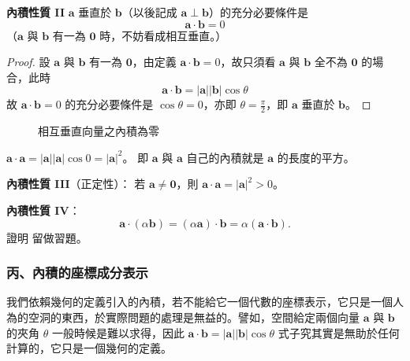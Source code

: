\textbf{內積性質 II}\quad
$\mathbf{a}$ 垂直於 $\mathbf{b}$（以後記成 $\mathbf{a} \perp \mathbf{b}$）的充分必要條件是
\[ \mathbf{a}\cdot\mathbf{b} = 0 \]
（$\mathbf{a}$ 與 $\mathbf{b}$ 有一為 $\mathbf{0}$ 時，不妨看成相互垂直。）

\begin{proof}
設 $\mathbf{a}$ 與 $\mathbf{b}$ 有一為 $\mathbf{0}$，由定義 $\mathbf{a}\cdot\mathbf{b} = 0$，故只須看 $\mathbf{a}$ 與 $\mathbf{b}$ 全不為 $\mathbf{0}$ 的場合，此時
\[ \mathbf{a}\cdot\mathbf{b} = |\mathbf{a}||\mathbf{b}|\cos\theta \]
故 $\mathbf{a}\cdot\mathbf{b} = 0$ 的充分必要條件是 $\cos\theta = 0$，亦即 $\theta = \frac{\pi}{2}$，即 $\mathbf{a}$ 垂直於 $\mathbf{b}$。\qedhere
\end{proof}

\begin{figure}[H]
\centering
{}
\caption{相互垂直向量之內積為零}
\label{fig:b3-fig3-37}
\end{figure}

\begin{proposition}
$\mathbf{a}\cdot\mathbf{a} = |\mathbf{a}||\mathbf{a}|\cos 0 = |\mathbf{a}|^2$。
即 $\mathbf{a}$ 與 $\mathbf{a}$ 自己的內積就是 $\mathbf{a}$ 的長度的平方。\qedhere
\end{proposition}

\textbf{內積性質 III}（正定性）：
若 $\mathbf{a} \ne \mathbf{0}$，則 $\mathbf{a}\cdot\mathbf{a} = |\mathbf{a}|^2 > 0$。

\textbf{內積性質 IV}：
\[ \mathbf{a}\cdot(\alpha\mathbf{b}) = (\alpha\mathbf{a})\cdot\mathbf{b} = \alpha(\mathbf{a}\cdot\mathbf{b}). \]
證明 留做習題。

\subsubsection*{丙、內積的座標成分表示}

我們依賴幾何的定義引入的內積，若不能給它一個代數的座標表示，它只是一個人為的空洞的東西，於實際問題的處理是無益的。譬如，空間給定兩個向量 $\mathbf{a}$ 與 $\mathbf{b}$ 的夾角 $\theta$ 一般時候是難以求得，因此 $\mathbf{a}\cdot\mathbf{b} = |\mathbf{a}||\mathbf{b}|\cos\theta$ 式子究其實是無助於任何計算的，它只是一個幾何的定義。

